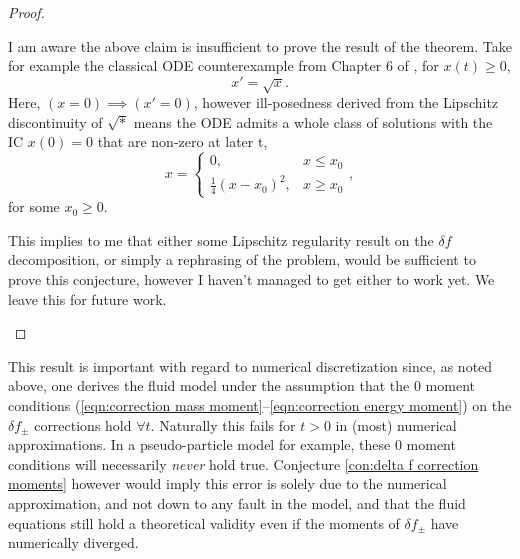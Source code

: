 \begin{proof}
\begin{enumerate}
            \begin{remark}
                I am aware the above claim is insufficient to prove the result of the theorem. Take for example the classical ODE counterexample from Chapter 6 of \cite{Robinson_2004}, for $x(t)  \geq  0$,
                \begin{equation}
                    x'  =  \sqrt{x}.
                \end{equation}
                Here, $(x = 0)  \implies  (x'  =  0)$, however ill-posedness derived from the Lipschitz discontinuity of $\sqrt{*}$ means the ODE admits a whole class of solutions with the IC $x(0) = 0$ that are non-zero at later t,
                \begin{equation}
                    x  =  \left\{\begin{matrix}
                        0,                           &  x \leq x_{0}  \\ 
                        \frac{1}{4}(x - x_{0})^{2},  &  x \geq x_{0}
                    \end{matrix}\right.,
                \end{equation}
                for some $x_{0}  \geq  0$.
                
                This implies to me that either some Lipschitz regularity result on the $\delta\!f$ decomposition, or simply a rephrasing of the problem, would be sufficient to prove this conjecture, however I haven't managed to get either to work yet. We leave this for future work.
            \end{remark}
        \end{enumerate}
    \end{proof}

    This result is important with regard to numerical discretization since, as noted above, one derives the fluid model under the assumption that the 0 moment conditions (\ref{eqn:correction mass moment}--\ref{eqn:correction energy moment}) on the $\delta\!f_{\pm}$ corrections hold $\forall t$. Naturally this fails for $t > 0$ in (most) numerical approximations. In a pseudo-particle model for example, these 0 moment conditions will necessarily \emph{never} hold true. Conjecture \ref{con:delta f correction moments} however would imply this error is solely due to the numerical approximation, and not down to any fault in the model, and that the fluid equations still hold a theoretical validity even if the moments of $\delta\!f_{\pm}$ have numerically diverged.
    
